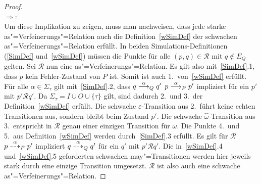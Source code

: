 \begin{proof}\mbox{}\\
  \glqq $\Rightarrow$\grqq{}:\\
  Um diese Implikation zu zeigen, muss man nachweisen, dass jede starke
  as"=Verfeinerungs"=Relation auch die Definition~\ref{wSimDef} der schwachen
  as"=Verfeinerungs"=Relation erfüllt. In beiden Simulations-Definitionen
  (\ref{SimDef} und~\ref{wSimDef}) müssen die Punkte für alle $(p,q) \in
  \mathcal{R}$ mit $q\notin E_Q$ gelten. Sei $\mathcal{R}$ nun eine
  as"=Verfeinerungs"=Relation. Es gilt also mit~\ref{SimDef}.1, dass $p$ kein
  Fehler-Zustand von $P$ ist. Somit ist auch 1.\ von~\ref{wSimDef} erfüllt. Für
  alle $\alpha\in\Sigma _{\tau}$ gilt mit~\ref{SimDef}.2, dass $q
  \must[\alpha]_Q q'$ $p\must[\alpha]_P p'$ impliziert für ein $p'$ mit
  $p'\mathcal{R} q'$. Da $\Sigma _{\tau} = I \cup O \cup \{\tau\}$ gilt, sind
  dadurch 2.\ und 3.\ der Definition~\ref{wSimDef} erfüllt. Die schwache
  $\varepsilon$-Transition aus 2.\ führt keine echten Transitionen aus, sondern
  bleibt beim Zustand $p'$. Die schwache $\widehat{\omega}$-Transition aus 3.\
  entspricht in $\mathcal{R}$ genau einer einzigen Transition für $\omega$. Die
  Punkte 4.\ und 5.\ aus Definition~\ref{wSimDef} werden durch~\ref{SimDef}.3
  erfüllt. Es gilt für $\mathcal{R}$ $p\may[\alpha]_P p'$ impliziert $q
  \may[\alpha]_Q q'$ für ein $q'$ mit $p'\mathcal{R}q'$. Die in~\ref{wSimDef}.4
  und~\ref{wSimDef}.5 geforderten schwachen may"=Transitionen werden hier
  jeweils stark durch eine einzige Transition umgesetzt. $\mathcal{R}$ ist also
  auch eine schwache as"=Verfeinerungs"=Relation.


\end{proof}
